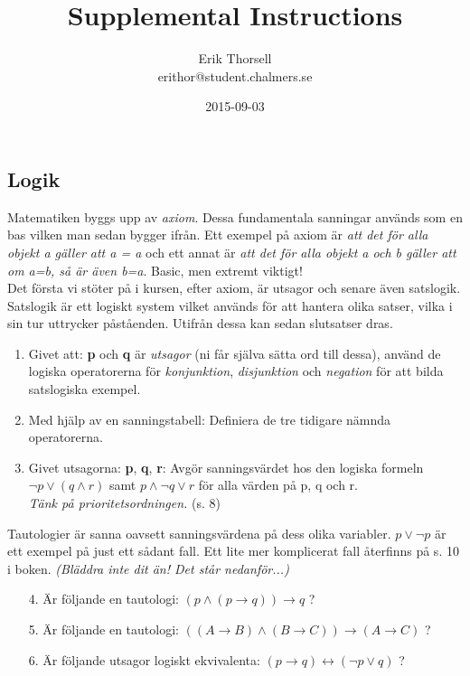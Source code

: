 \documentclass{article}
\title{Supplemental Instructions}
\author{Erik Thorsell \\ 
		\small{erithor@student.chalmers.se}
}
\date{2015-09-03}
\begin{document}
\maketitle

\subsection*{Logik}
Matematiken byggs upp av {\it axiom}. Dessa fundamentala sanningar används som en bas vilken man sedan bygger ifrån. Ett exempel på axiom är {\it att det för alla objekt a gäller att a = a} och ett annat är {\it att det för alla objekt a och b gäller att om a=b, så är även b=a}. Basic, men extremt viktigt!\\
Det första vi stöter på i kursen, efter axiom, är utsagor och senare även satslogik. Satslogik är ett logiskt system vilket används för att hantera olika satser, vilka i sin tur uttrycker påståenden. Utifrån dessa kan sedan slutsatser dras.
 
\begin{enumerate}
\item  Givet att: {\bf p} och {\bf q} är {\it utsagor} (ni får själva sätta ord till dessa), använd de logiska operatorerna för {\it konjunktion}, {\it disjunktion} och {\it negation} för att bilda satslogiska exempel.
\item Med hjälp av en sanningstabell: Definiera de tre tidigare nämnda operatorerna.
\item Givet utsagorna: {\bf p}, {\bf q}, {\bf r}: Avgör sanningsvärdet hos den logiska formeln $\neg p \lor (q \land r)$ samt $p \land \neg q \lor r$ för alla värden på p, q och r. \\
{\it Tänk på prioritetsordningen.} (s. 8)
\end{enumerate}

Tautologier är sanna oavsett sanningsvärdena på dess olika variabler. $p \lor \neg p$ är ett exempel på just ett sådant fall. Ett lite mer komplicerat fall återfinns på s. 10 i boken. {\it (Bläddra inte dit än! Det står nedanför...)}

\begin{enumerate}
\item[4.] Är följande en tautologi: $(p \land (p \rightarrow q)) \rightarrow q$ ?
\item[5.] Är följande en tautologi: $((A \rightarrow B) \land (B \rightarrow C)) \rightarrow (A \rightarrow C)$ ?
\item[6.] Är följande utsagor logiskt ekvivalenta: $(p \rightarrow q) \leftrightarrow (\neg p \lor q)$ ?
\end{enumerate}
\end{document}
